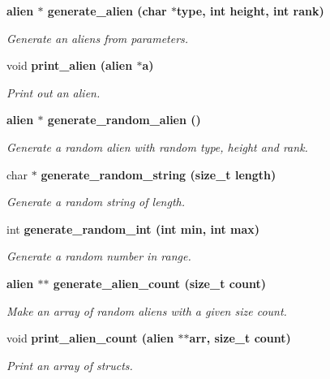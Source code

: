 \begin{CompactItemize}
\item 
\bf{alien} $\ast$ \bf{generate\_\-alien} (char $\ast$type, int height, int rank)
\begin{CompactList}\small\item\em Generate an aliens from parameters. \item\end{CompactList}\item 
void \bf{print\_\-alien} (\bf{alien} $\ast$a)
\begin{CompactList}\small\item\em Print out an alien. \item\end{CompactList}\item 
\bf{alien} $\ast$ \bf{generate\_\-random\_\-alien} ()
\begin{CompactList}\small\item\em Generate a random alien with random type, height and rank. \item\end{CompactList}\item 
char $\ast$ \bf{generate\_\-random\_\-string} (size\_\-t length)
\begin{CompactList}\small\item\em Generate a random string of length. \item\end{CompactList}\item 
int \bf{generate\_\-random\_\-int} (int min, int max)
\begin{CompactList}\small\item\em Generate a random number in range. \item\end{CompactList}\item 
\bf{alien} $\ast$$\ast$ \bf{generate\_\-alien\_\-count} (size\_\-t count)
\begin{CompactList}\small\item\em Make an array of random aliens with a given size count. \item\end{CompactList}\item 
void \bf{print\_\-alien\_\-count} (\bf{alien} $\ast$$\ast$arr, size\_\-t count)
\begin{CompactList}\small\item\em Print an array of structs. \item\end{CompactList}\item 

\end{CompactItemize}
